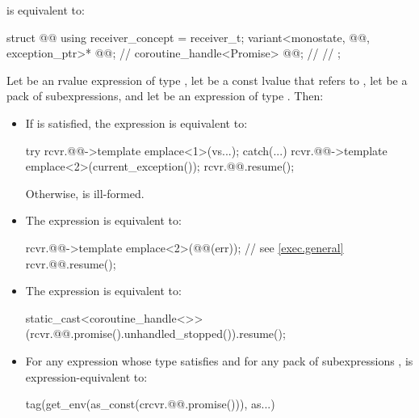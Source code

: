 \pnum
{} is equivalent to:
\begin{codeblock}
struct @@ {
  using receiver_concept = receiver_t;
  variant<monostate, @@, exception_ptr>* @@;   // \expos
  coroutine_handle<Promise> @@;                       // \expos
  // \seebelow
};
\end{codeblock}

\pnum
Let  be an rvalue expression of type ,
let  be a const lvalue that refers to ,
let  be a pack of subexpressions, and
let  be an expression of type . Then:
\begin{itemize}
\item
If 
is satisfied,
the expression  is equivalent to:
\begin{codeblock}
try {
  rcvr.@@->template emplace<1>(vs...);
} catch(...) {
  rcvr.@@->template emplace<2>(current_exception());
}
rcvr.@@.resume();
\end{codeblock}
Otherwise,  is ill-formed.
\item
The expression  is equivalent to:
\begin{codeblock}
rcvr.@@->template emplace<2>(@@(err));    // see \ref{exec.general}
rcvr.@@.resume();
\end{codeblock}
\item
The expression  is equivalent to:
\begin{codeblock}
static_cast<coroutine_handle<>>(rcvr.@@.promise().unhandled_stopped()).resume();
\end{codeblock}
\item
For any expression 
whose type satisfies  and
for any pack of subexpressions ,
 is expression-equivalent to:
\begin{codeblock}
tag(get_env(as_const(crcvr.@@.promise())), as...)
\end{codeblock}
\end{itemize}

